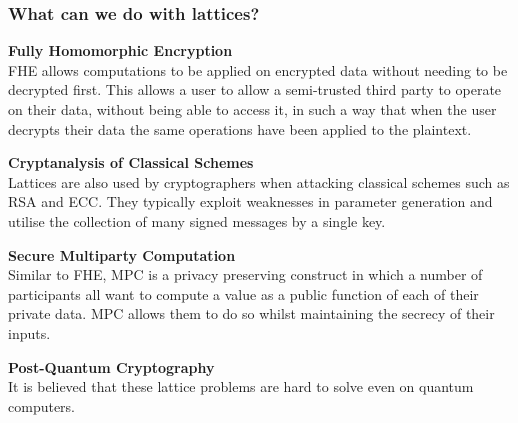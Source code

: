 \documentclass[
aspectratio=169, %
t, %
onlytextwidth, %
10pt, %
]{beamer}
\begin{document}
\begin{frame}
    \frametitle{What can we do with lattices?}

    \begin{minipage}[t][0.45\textheight][t]{0.48\linewidth}
        \textbf{Fully Homomorphic Encryption}\\
        FHE allows computations to be applied on encrypted data without needing to be decrypted first. This allows a user to allow a semi-trusted third party to operate on their data, without being able to access it, in such a way that when the user decrypts their data the same operations have been applied to the plaintext.
    \end{minipage}%
    \hfill
    \begin{minipage}[t][0.45\textheight][t]{0.48\linewidth}
        \textbf{Cryptanalysis of Classical Schemes}\\
        Lattices are also used by cryptographers when attacking classical schemes such as RSA and ECC. They typically exploit weaknesses in parameter generation and utilise the collection of many signed messages by a single key.
    \end{minipage}
    

    \vspace{-1.5em}
    \begin{minipage}[t][0.45\textheight][t]{0.48\linewidth}
        \textbf{Secure Multiparty Computation}\\
        Similar to FHE, MPC is a privacy preserving construct in which a number of participants all want to compute a value as a public function of each of their private data. MPC allows them to do so whilst maintaining the secrecy of their inputs.
    \end{minipage}
    \hfill
    \begin{minipage}[t][0.2\textheight][t]{0.48\linewidth}
        \vspace{3.5em}
        \textbf{Post-Quantum Cryptography}\\
        It is believed that these lattice problems are hard to solve even on quantum computers.
    \end{minipage}
\end{frame}

\end{document}
